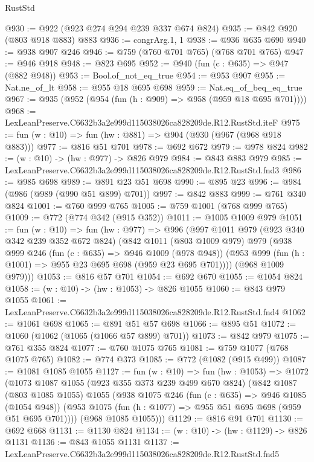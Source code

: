 \begin{lexlean}{RustStd}
\begin{coremodule}
@930 := @922 (@923 @274 @294 @239 @337 @674 @824)
@935 := @842 @920 (@803 @918 @883) @883
@936 := congrArg.{1, 1}
@938 := @936 @635 @690
@940 := @938 @907 @246
@946 := @759 (@760 @701 @765) (@768 @701 @765)
@947 := @946 @918
@948 := @823 @695
@952 := @940 (fun (c : @635) => @947 (@882 @948))
@953 := Bool.of_not_eq_true
@954 := @953 @907
@955 := Nat.ne_of_lt
@958 := @955 @18 @695 @698
@959 := Nat.eq_of_beq_eq_true
@967 := @935 (@952 (@954 (fun (h : @909) => @958 (@959 @18 @695 @701))))
@968 := LexLeanPreserve.C6632b3a2e999d115038026ca828209de.R12.RustStd.iteF
@975 := fun (w : @10) => fun (hw : @881) => @904 (@930 (@967 (@968 @918 @883)))
@977 := @816 @51 @701
@978 := @692 @672
@979 := @978 @824
@982 := (w : @10) -> (hw : @977) -> @826 @979
@984 := @843 @883 @979
@985 := LexLeanPreserve.C6632b3a2e999d115038026ca828209de.R12.RustStd.fnd3
@986 := @985 @698
@989 := @891 @23 @51 @698
@990 := @895 @23
@996 := @984 (@986 (@989 (@990 @51 @899) @701))
@997 := @842 @883
@999 := @761 @340 @824
@1001 := @760 @999 @765
@1005 := @759 @1001 (@768 @999 @765)
@1009 := @772 (@774 @342 (@915 @352))
@1011 := @1005 @1009 @979
@1051 := fun (w : @10) =>
  fun (hw : @977) =>
  @996
    (@997
      @1011
      @979
      (@923 @340 @342 @239 @352 @672 @824)
      (@842
        @1011
        (@803 @1009 @979)
        @979
        (@938
          @999
          @246
          (fun (c : @635) => @946 @1009 (@978 @948))
          (@953 @999 (fun (h : @1001) => @955 @23 @695 @698 (@959 @23 @695 @701))))
        (@968 @1009 @979)))
@1053 := @816 @57 @701
@1054 := @692 @670
@1055 := @1054 @824
@1058 := (w : @10) -> (hw : @1053) -> @826 @1055
@1060 := @843 @979 @1055
@1061 := LexLeanPreserve.C6632b3a2e999d115038026ca828209de.R12.RustStd.fnd4
@1062 := @1061 @698
@1065 := @891 @51 @57 @698
@1066 := @895 @51
@1072 := @1060 (@1062 (@1065 (@1066 @57 @899) @701))
@1073 := @842 @979
@1075 := @761 @355 @824
@1077 := @760 @1075 @765
@1081 := @759 @1077 (@768 @1075 @765)
@1082 := @774 @373
@1085 := @772 (@1082 (@915 @499))
@1087 := @1081 @1085 @1055
@1127 := fun (w : @10) =>
  fun (hw : @1053) =>
  @1072
    (@1073
      @1087
      @1055
      (@923 @355 @373 @239 @499 @670 @824)
      (@842
        @1087
        (@803 @1085 @1055)
        @1055
        (@938
          @1075
          @246
          (fun (c : @635) => @946 @1085 (@1054 @948))
          (@953 @1075 (fun (h : @1077) => @955 @51 @695 @698 (@959 @51 @695 @701))))
        (@968 @1085 @1055)))
@1129 := @816 @91 @701
@1130 := @692 @668
@1131 := @1130 @824
@1134 := (w : @10) -> (hw : @1129) -> @826 @1131
@1136 := @843 @1055 @1131
@1137 := LexLeanPreserve.C6632b3a2e999d115038026ca828209de.R12.RustStd.fnd5

\end{coremodule}
\end{lexlean}
